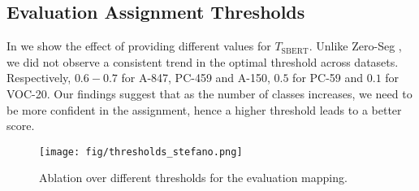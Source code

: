 \subsection{Evaluation Assignment Thresholds} \label{sec:thresholds}
In  we show the effect of providing different values for $T_\text{SBERT}$. Unlike Zero-Seg \cite{rewatbowornwong2023zero}, we did not observe a consistent trend in the optimal threshold across datasets. Respectively, $0.6-0.7$ for A-847, PC-459 and A-150, $0.5$ for PC-59 and $0.1$ for VOC-20. 
Our findings suggest that as the number of classes increases, we need to be more confident in the assignment, hence a higher threshold leads to a better score.

\begin{figure}
    \centering
    \texttt{[image: fig/thresholds\_stefano.png]}
    \caption{Ablation over different thresholds for the evaluation mapping.%
    }
    \label{fig:thresh}
\end{figure}



